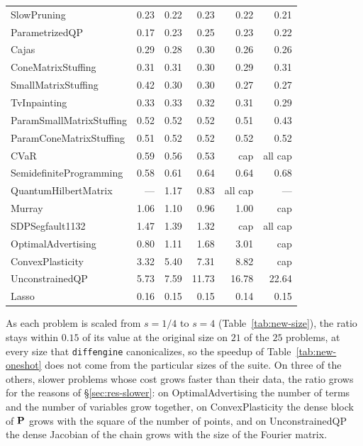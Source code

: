 \documentclass[letterpaper,12pt]{article}
\begin{document}
\begin{table}[htbp]
{\begin{tabular}{l rrrrr}
SlowPruning                 &    0.23 &    0.22 &    0.23 &    0.22 &    0.21 \\
ParametrizedQP              &    0.17 &    0.23 &    0.25 &    0.23 &    0.22 \\
Cajas                       &    0.29 &    0.28 &    0.30 &    0.26 &    0.26 \\
ConeMatrixStuffing          &    0.31 &    0.31 &    0.30 &    0.29 &    0.31 \\
SmallMatrixStuffing         &    0.42 &    0.30 &    0.30 &    0.27 &    0.27 \\
TvInpainting                &    0.33 &    0.33 &    0.32 &    0.31 &    0.29 \\
ParamSmallMatrixStuffing    &    0.52 &    0.52 &    0.52 &    0.51 &    0.43 \\
ParamConeMatrixStuffing     &    0.51 &    0.52 &    0.52 &    0.52 &    0.52 \\
CVaR                        &    0.59 &    0.56 &    0.53 &     cap & all cap \\
SemidefiniteProgramming     &    0.58 &    0.61 &    0.64 &    0.64 &    0.68 \\
QuantumHilbertMatrix        &     --- &    1.17 &    0.83 & all cap &     --- \\
Murray                      &    1.06 &    1.10 &    0.96 &    1.00 &     cap \\
SDPSegfault1132             &    1.47 &    1.39 &    1.32 &     cap & all cap \\
OptimalAdvertising          &    0.80 &    1.11 &    1.68 &    3.01 &     cap \\
ConvexPlasticity            &    3.32 &    5.40 &    7.31 &    8.82 &     cap \\
UnconstrainedQP             &    5.73 &    7.59 &   11.73 &   16.78 &   22.64 \\
Lasso                       &    0.16 &    0.15 &    0.15 &    0.14 &    0.15 \\
\bottomrule
\end{tabular}}
\end{table}

As each problem is scaled from $s = 1/4$ to $s = 4$ (Table~\ref{tab:new-size}), the ratio stays
within $0.15$ of its value at the original size on $21$ of the $25$ problems, at every size that
\texttt{diffengine} canonicalizes, so the speedup of
Table~\ref{tab:new-oneshot} does not come from the particular sizes of the suite. On three of the
others, slower problems whose cost grows faster than their data, the ratio grows for the reasons
of \S\ref{sec:res-slower}: on OptimalAdvertising the number of terms and the number of variables
grow together, on ConvexPlasticity the dense block of $\mathbf{P}$ grows with the square of the
number of points, and on UnconstrainedQP the dense Jacobian of the chain grows with the size of
the Fourier matrix.
\end{document}
